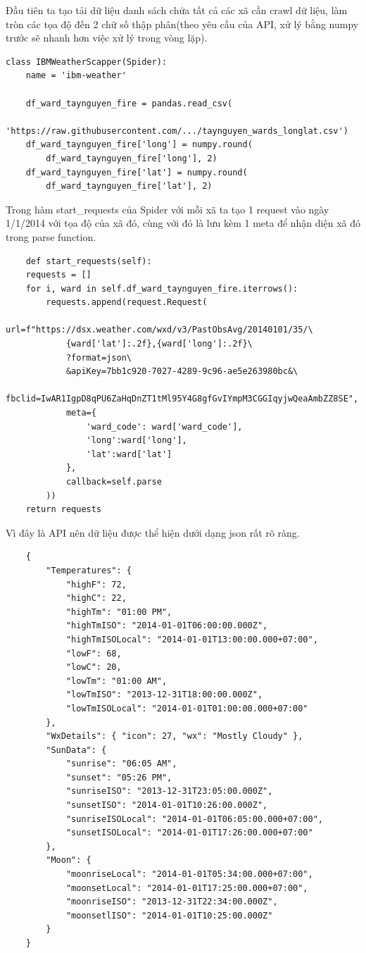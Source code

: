 \documentclass{article}
\begin{document}
Đầu tiên ta tạo tải dữ liệu danh sách chứa tất cả các xã cần crawl dữ liệu, làm tròn các tọa độ đến 2 chữ số thập phân(theo yêu cầu của API, xử lý bằng numpy trước sẽ nhanh hơn việc xử lý trong vòng lặp).

\begin{verbatim}
class IBMWeatherScapper(Spider):
    name = 'ibm-weather'

    df_ward_taynguyen_fire = pandas.read_csv(
        'https://raw.githubusercontent.com/.../taynguyen_wards_longlat.csv')
    df_ward_taynguyen_fire['long'] = numpy.round(
        df_ward_taynguyen_fire['long'], 2)
    df_ward_taynguyen_fire['lat'] = numpy.round(
        df_ward_taynguyen_fire['lat'], 2)
\end{verbatim}

Trong hàm start\_requests của Spider với mỗi xã ta tạo 1 request vào ngày 1/1/2014 với tọa độ của xã đó, cùng với đó là lưu kèm 1 meta để nhận diện xã đó trong parse function.

\begin{verbatim}
	def start_requests(self):
	requests = []
	for i, ward in self.df_ward_taynguyen_fire.iterrows():
		requests.append(request.Request(
			url=f"https://dsx.weather.com/wxd/v3/PastObsAvg/20140101/35/\
			{ward['lat']:.2f},{ward['long']:.2f}\
			?format=json\
			&apiKey=7bb1c920-7027-4289-9c96-ae5e263980bc&\
			fbclid=IwAR1IgpD8qPU6ZaHqDnZT1tMl95Y4G8gfGvIYmpM3CGGIqyjwQeaAmbZZ8SE",
			meta={
				'ward_code': ward['ward_code'],
				'long':ward['long'],
				'lat':ward['lat']
			},
			callback=self.parse
		))
	return requests
\end{verbatim}

Vì đây là API nên dữ liệu được thể hiện dưới dạng json rất rõ ràng.

\begin{verbatim}
	{
        "Temperatures": {
            "highF": 72,
            "highC": 22,
            "highTm": "01:00 PM",
            "highTmISO": "2014-01-01T06:00:00.000Z",
            "highTmISOLocal": "2014-01-01T13:00:00.000+07:00",
            "lowF": 68,
            "lowC": 20,
            "lowTm": "01:00 AM",
            "lowTmISO": "2013-12-31T18:00:00.000Z",
            "lowTmISOLocal": "2014-01-01T01:00:00.000+07:00"
        },
        "WxDetails": { "icon": 27, "wx": "Mostly Cloudy" },
        "SunData": {
            "sunrise": "06:05 AM",
            "sunset": "05:26 PM",
            "sunriseISO": "2013-12-31T23:05:00.000Z",
            "sunsetISO": "2014-01-01T10:26:00.000Z",
            "sunriseISOLocal": "2014-01-01T06:05:00.000+07:00",
            "sunsetISOLocal": "2014-01-01T17:26:00.000+07:00"
        },
        "Moon": {
            "moonriseLocal": "2014-01-01T05:34:00.000+07:00",
            "moonsetLocal": "2014-01-01T17:25:00.000+07:00",
            "moonriseISO": "2013-12-31T22:34:00.000Z",
            "moonsetlISO": "2014-01-01T10:25:00.000Z"
        }
    }
\end{verbatim}
\end{document}
